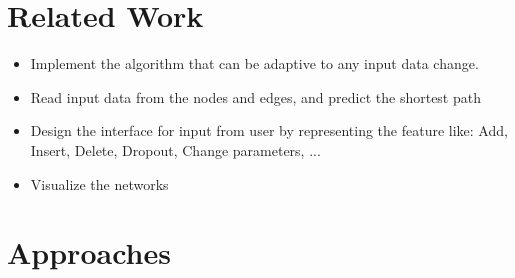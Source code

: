 \documentclass{article}
\begin{document}
\section{Related Work}

\begin{itemize}
\item Implement the algorithm that can be adaptive to any input data change.
\item Read input data from the nodes and edges, and predict the shortest path
\item Design the interface for input from user by representing the feature like: Add, Insert, Delete, Dropout, Change parameters, ... 
\item Visualize the networks
\end{itemize}

\section{Approaches}
\end{document}
